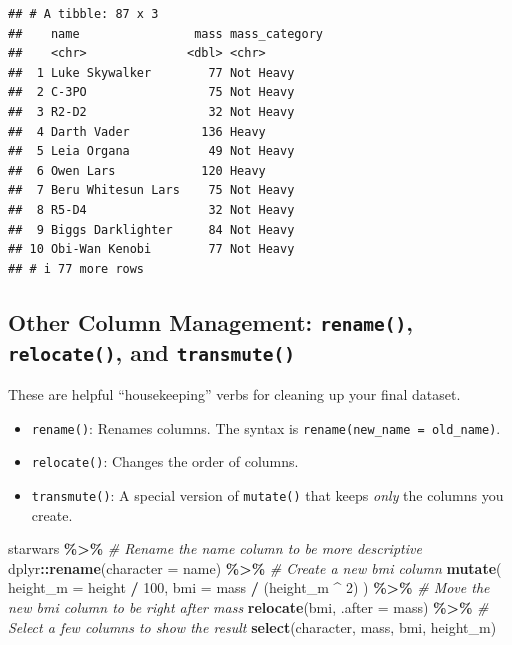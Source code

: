 \documentclass[
  11pt,
]{article}
\newenvironment{Shaded}{\begin{snugshade}}{\end{snugshade}}
\newcommand{\AttributeTok}[1]{\textcolor[rgb]{0.13,0.29,0.53}{#1}}
\newcommand{\CommentTok}[1]{\textcolor[rgb]{0.56,0.35,0.01}{\textit{#1}}}
\newcommand{\DecValTok}[1]{\textcolor[rgb]{0.00,0.00,0.81}{#1}}
\newcommand{\FunctionTok}[1]{\textcolor[rgb]{0.13,0.29,0.53}{\textbf{#1}}}
\newcommand{\NormalTok}[1]{#1}
\newcommand{\SpecialCharTok}[1]{\textcolor[rgb]{0.81,0.36,0.00}{\textbf{#1}}}
\providecommand{\tightlist}{%
  \setlength{\itemsep}{0pt}\setlength{\parskip}{0pt}}
\begin{document}
\begin{verbatim}
## # A tibble: 87 x 3
##    name                mass mass_category
##    <chr>              <dbl> <chr>        
##  1 Luke Skywalker        77 Not Heavy    
##  2 C-3PO                 75 Not Heavy    
##  3 R2-D2                 32 Not Heavy    
##  4 Darth Vader          136 Heavy        
##  5 Leia Organa           49 Not Heavy    
##  6 Owen Lars            120 Heavy        
##  7 Beru Whitesun Lars    75 Not Heavy    
##  8 R5-D4                 32 Not Heavy    
##  9 Biggs Darklighter     84 Not Heavy    
## 10 Obi-Wan Kenobi        77 Not Heavy    
## # i 77 more rows
\end{verbatim}

\subsection{\texorpdfstring{Other Column Management: \texttt{rename()},
\texttt{relocate()}, and
\texttt{transmute()}}{Other Column Management: rename(), relocate(), and transmute()}}\label{other-column-management-rename-relocate-and-transmute}

These are helpful ``housekeeping'' verbs for cleaning up your final
dataset.

\begin{itemize}
\tightlist
\item
  \texttt{rename()}: Renames columns. The syntax is
  \texttt{rename(new\_name\ =\ old\_name)}.
\item
  \texttt{relocate()}: Changes the order of columns.
\item
  \texttt{transmute()}: A special version of \texttt{mutate()} that
  keeps \emph{only} the columns you create.
\end{itemize}

\begin{Shaded}
\begin{Highlighting}[]
\NormalTok{starwars }\SpecialCharTok{\%\textgreater{}\%}
  \CommentTok{\# Rename the \textquotesingle{}name\textquotesingle{} column to be more descriptive}
\NormalTok{  dplyr}\SpecialCharTok{::}\FunctionTok{rename}\NormalTok{(}\AttributeTok{character =}\NormalTok{ name) }\SpecialCharTok{\%\textgreater{}\%}
  \CommentTok{\# Create a new bmi column}
  \FunctionTok{mutate}\NormalTok{(}
    \AttributeTok{height\_m =}\NormalTok{ height }\SpecialCharTok{/} \DecValTok{100}\NormalTok{,}
    \AttributeTok{bmi =}\NormalTok{ mass }\SpecialCharTok{/}\NormalTok{ (height\_m }\SpecialCharTok{\^{}} \DecValTok{2}\NormalTok{)}
\NormalTok{  ) }\SpecialCharTok{\%\textgreater{}\%}
  \CommentTok{\# Move the new bmi column to be right after mass}
  \FunctionTok{relocate}\NormalTok{(bmi, }\AttributeTok{.after =}\NormalTok{ mass) }\SpecialCharTok{\%\textgreater{}\%}
  \CommentTok{\# Select a few columns to show the result}
  \FunctionTok{select}\NormalTok{(character, mass, bmi, height\_m)}
\end{Highlighting}
\end{Shaded}
\end{document}
